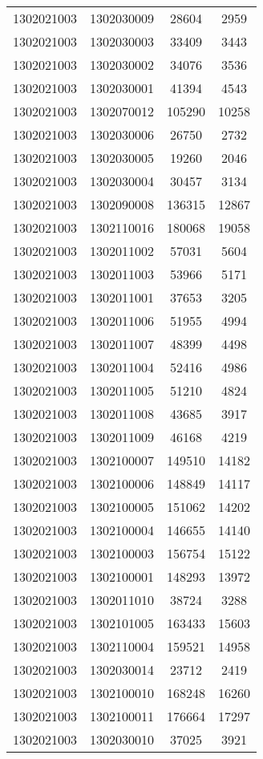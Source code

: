 \begin{longtable}[h]{llcc}
		1302021003 & 1302030009 & 28604 & 2959\\
		1302021003 & 1302030003 & 33409 & 3443\\
		1302021003 & 1302030002 & 34076 & 3536\\
		1302021003 & 1302030001 & 41394 & 4543\\
		1302021003 & 1302070012 & 105290 & 10258\\
		1302021003 & 1302030006 & 26750 & 2732\\
		1302021003 & 1302030005 & 19260 & 2046\\
		1302021003 & 1302030004 & 30457 & 3134\\
		1302021003 & 1302090008 & 136315 & 12867\\
		1302021003 & 1302110016 & 180068 & 19058\\
		1302021003 & 1302011002 & 57031 & 5604\\
		1302021003 & 1302011003 & 53966 & 5171\\
		1302021003 & 1302011001 & 37653 & 3205\\
		1302021003 & 1302011006 & 51955 & 4994\\
		1302021003 & 1302011007 & 48399 & 4498\\
		1302021003 & 1302011004 & 52416 & 4986\\
		1302021003 & 1302011005 & 51210 & 4824\\
		1302021003 & 1302011008 & 43685 & 3917\\
		1302021003 & 1302011009 & 46168 & 4219\\
		1302021003 & 1302100007 & 149510 & 14182\\
		1302021003 & 1302100006 & 148849 & 14117\\
		1302021003 & 1302100005 & 151062 & 14202\\
		1302021003 & 1302100004 & 146655 & 14140\\
		1302021003 & 1302100003 & 156754 & 15122\\
		1302021003 & 1302100001 & 148293 & 13972\\
		1302021003 & 1302011010 & 38724 & 3288\\
		1302021003 & 1302101005 & 163433 & 15603\\
		1302021003 & 1302110004 & 159521 & 14958\\
		1302021003 & 1302030014 & 23712 & 2419\\
		1302021003 & 1302100010 & 168248 & 16260\\
		1302021003 & 1302100011 & 176664 & 17297\\
		1302021003 & 1302030010 & 37025 & 3921\\

\end{longtable}

